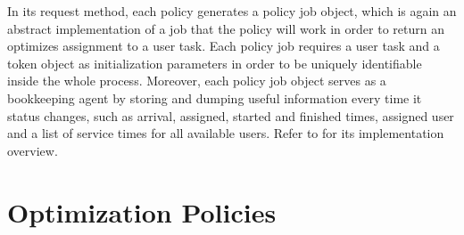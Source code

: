 \documentclass{seal_thesis}
\begin{document}

In its request method, each policy generates a policy job object, which is again an abstract implementation of a job that the policy will work in order to return an optimizes assignment to a user task. Each policy job requires a user task and a token object as initialization parameters in order to be uniquely identifiable inside the whole process. Moreover, each policy job object serves as a bookkeeping agent by storing and dumping useful information every time it status changes, such as arrival, assigned, started and finished times, assigned user and a list of service times for all available users. Refer to  for its implementation overview.


\section{Optimization Policies}
\label{sec:opt_policies}
\end{document}
